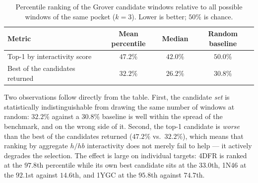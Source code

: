 \begin{table}[htbp]
\centering
\caption{Percentile ranking of the Grover candidate windows relative to all possible
windows of the same pocket ($k=3$). Lower is better; $50\%$ is chance.}
\label{tab:percentile}
\begin{tabular}{lccc}
\toprule
\textbf{Metric} & \textbf{Mean percentile} & \textbf{Median} & \textbf{Random baseline} \\
\midrule
Top-1 by interactivity score   & $47.2\%$ & $42.0\%$ & $50.0\%$ \\
Best of the candidates returned & $32.2\%$ & $26.2\%$ & $30.8\%$ \\
\bottomrule
\end{tabular}
\end{table}

Two observations follow directly from the table. First, the candidate \emph{set} is
statistically indistinguishable from drawing the same number of windows at random:
$32.2\%$ against a $30.8\%$ baseline is well within the spread of the benchmark, and on
the wrong side of it. Second, the top-1 candidate is \emph{worse} than the best of the
candidates returned ($47.2\%$ vs.\ $32.2\%$), which means that ranking by aggregate
$h/hb$ interactivity does not merely fail to help --- it actively degrades the selection.
The effect is large on individual targets: 4DFR is ranked at the $97.8$th percentile
while its own best candidate sits at the $33.0$th, 1N46 at the $92.1$st against
$14.6$th, and 1YGC at the $95.8$th against $74.7$th.

